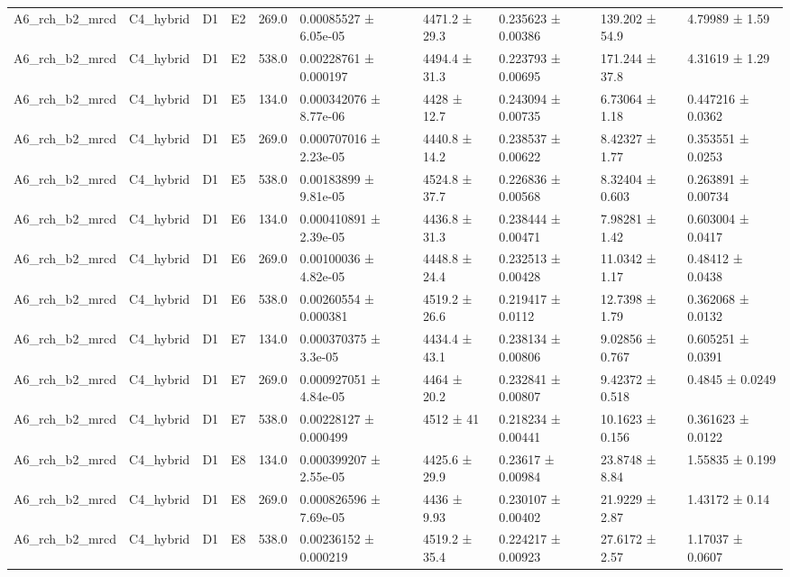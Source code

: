\begin{table}
\begin{tabular}{llllllllll}
A6\_rch\_b2\_mrcd & C4\_hybrid & D1 & E2 & 269.0 & 0.00085527 ± 6.05e-05 & 4471.2 ± 29.3 & 0.235623 ± 0.00386 & 139.202 ± 54.9 & 4.79989 ± 1.59 \\
A6\_rch\_b2\_mrcd & C4\_hybrid & D1 & E2 & 538.0 & 0.00228761 ± 0.000197 & 4494.4 ± 31.3 & 0.223793 ± 0.00695 & 171.244 ± 37.8 & 4.31619 ± 1.29 \\
A6\_rch\_b2\_mrcd & C4\_hybrid & D1 & E5 & 134.0 & 0.000342076 ± 8.77e-06 & 4428 ± 12.7 & 0.243094 ± 0.00735 & 6.73064 ± 1.18 & 0.447216 ± 0.0362 \\
A6\_rch\_b2\_mrcd & C4\_hybrid & D1 & E5 & 269.0 & 0.000707016 ± 2.23e-05 & 4440.8 ± 14.2 & 0.238537 ± 0.00622 & 8.42327 ± 1.77 & 0.353551 ± 0.0253 \\
A6\_rch\_b2\_mrcd & C4\_hybrid & D1 & E5 & 538.0 & 0.00183899 ± 9.81e-05 & 4524.8 ± 37.7 & 0.226836 ± 0.00568 & 8.32404 ± 0.603 & 0.263891 ± 0.00734 \\
A6\_rch\_b2\_mrcd & C4\_hybrid & D1 & E6 & 134.0 & 0.000410891 ± 2.39e-05 & 4436.8 ± 31.3 & 0.238444 ± 0.00471 & 7.98281 ± 1.42 & 0.603004 ± 0.0417 \\
A6\_rch\_b2\_mrcd & C4\_hybrid & D1 & E6 & 269.0 & 0.00100036 ± 4.82e-05 & 4448.8 ± 24.4 & 0.232513 ± 0.00428 & 11.0342 ± 1.17 & 0.48412 ± 0.0438 \\
A6\_rch\_b2\_mrcd & C4\_hybrid & D1 & E6 & 538.0 & 0.00260554 ± 0.000381 & 4519.2 ± 26.6 & 0.219417 ± 0.0112 & 12.7398 ± 1.79 & 0.362068 ± 0.0132 \\
A6\_rch\_b2\_mrcd & C4\_hybrid & D1 & E7 & 134.0 & 0.000370375 ± 3.3e-05 & 4434.4 ± 43.1 & 0.238134 ± 0.00806 & 9.02856 ± 0.767 & 0.605251 ± 0.0391 \\
A6\_rch\_b2\_mrcd & C4\_hybrid & D1 & E7 & 269.0 & 0.000927051 ± 4.84e-05 & 4464 ± 20.2 & 0.232841 ± 0.00807 & 9.42372 ± 0.518 & 0.4845 ± 0.0249 \\
A6\_rch\_b2\_mrcd & C4\_hybrid & D1 & E7 & 538.0 & 0.00228127 ± 0.000499 & 4512 ± 41 & 0.218234 ± 0.00441 & 10.1623 ± 0.156 & 0.361623 ± 0.0122 \\
A6\_rch\_b2\_mrcd & C4\_hybrid & D1 & E8 & 134.0 & 0.000399207 ± 2.55e-05 & 4425.6 ± 29.9 & 0.23617 ± 0.00984 & 23.8748 ± 8.84 & 1.55835 ± 0.199 \\
A6\_rch\_b2\_mrcd & C4\_hybrid & D1 & E8 & 269.0 & 0.000826596 ± 7.69e-05 & 4436 ± 9.93 & 0.230107 ± 0.00402 & 21.9229 ± 2.87 & 1.43172 ± 0.14 \\
A6\_rch\_b2\_mrcd & C4\_hybrid & D1 & E8 & 538.0 & 0.00236152 ± 0.000219 & 4519.2 ± 35.4 & 0.224217 ± 0.00923 & 27.6172 ± 2.57 & 1.17037 ± 0.0607 \\

\end{tabular}
\end{table}
